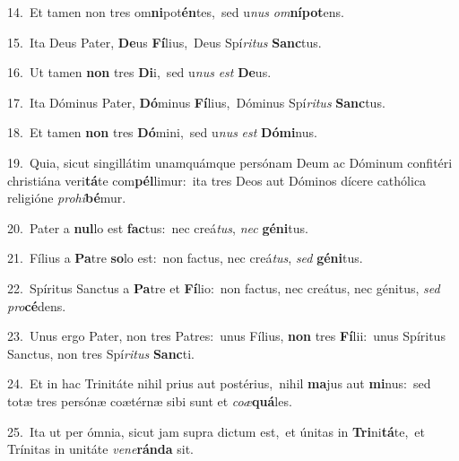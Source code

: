 {\numbfont\textcolor{\numbcolor}{14.}}~Et tamen non tres om\-\textbf{ni}\-pot\-\textbf{én}\-tes,~\star sed u\textit{nus} \textit{om}\-\textbf{ní}\textbf{pot}ens.\par
{\numbfont\textcolor{\numbcolor}{15.}}~Ita Deus Pater, \textbf{De}\-us \textbf{Fí}\-lius,~\star Deus Spí\-\textit{ri}\-\textit{tus} \textbf{Sanc}\-tus.\par
{\numbfont\textcolor{\numbcolor}{16.}}~Ut tamen \textbf{non} tres \textbf{Di}\-i,~\star sed u\textit{nus} \textit{est} \textbf{De}\-us.\par
{\numbfont\textcolor{\numbcolor}{17.}}~Ita Dóminus Pater, \textbf{Dó}\-minus \textbf{Fí}\-lius,~\star Dóminus Spí\-\textit{ri}\-\textit{tus} \textbf{Sanc}\-tus.\par
{\numbfont\textcolor{\numbcolor}{18.}}~Et tamen \textbf{non} tres \textbf{Dó}\-mini,~\star sed u\textit{nus} \textit{est} \textbf{Dó}\-\textbf{mi}nus.\par
{\numbfont\textcolor{\numbcolor}{19.}}~Quia, sicut singillátim unamquámque persónam Deum ac Dóminum confitéri christiána veri\-\textbf{tá}\-te com\-\textbf{pél}\-limur:~\star ita tres Deos aut Dóminos dícere cathólica religióne \textit{pro}\-\textit{hi}\textbf{bé}mur.\par
{\numbfont\textcolor{\numbcolor}{20.}}~Pater a \textbf{nul}\-lo est \textbf{fac}\-tus:~\star nec creá\-\textit{tus}\-, \textit{nec} \textbf{gé}\-\textbf{ni}tus.\par
{\numbfont\textcolor{\numbcolor}{21.}}~Fílius a \textbf{Pa}\-tre \textbf{so}\-lo est:~\star non factus, nec creá\-\textit{tus}\-, \textit{sed} \textbf{gé}\-\textbf{ni}tus.\par
{\numbfont\textcolor{\numbcolor}{22.}}~Spíritus Sanctus a \textbf{Pa}\-tre et \textbf{Fí}\-lio:~\star non factus, nec creátus, nec génitus, \textit{sed} \textit{pro}\-\textbf{cé}dens.\par
{\numbfont\textcolor{\numbcolor}{23.}}~Unus ergo Pater, non tres Patres:~\dagger unus Fílius, \textbf{non} tres \textbf{Fí}\-lii:~\star unus Spíritus Sanctus, non tres Spí\-\textit{ri}\-\textit{tus} \textbf{Sanc}\-ti.\par
{\numbfont\textcolor{\numbcolor}{24.}}~Et in hac Trinitáte nihil prius aut postérius,~\dagger nihil \textbf{ma}\-jus aut \textbf{mi}\-nus:~\star sed totæ tres persónæ coætérnæ sibi sunt et \textit{co}\-\textit{æ}\textbf{quá}les.\par
{\numbfont\textcolor{\numbcolor}{25.}}~Ita ut per ómnia, sicut jam supra dictum est,~\dagger et únitas in \textbf{Tri}\-ni\-\textbf{tá}\-te,~\star et Trínitas in unitáte \textit{ve}\-\textit{ne}\textbf{rán}\textbf{da} sit.\par

